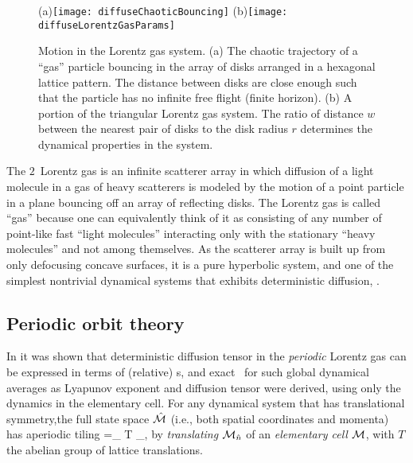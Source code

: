 \documentclass[aps,pre,
                showpacs,
                twocolumn,
                groupedaddress,
                floatfix]{revtex4-1}
\begin{document}
\begin{figure}[htbp]
  \begin{center}
    (a)\texttt{[image: diffuseChaoticBouncing]}
    (b)\texttt{[image: diffuseLorentzGasParams]}
  \end{center}
  \caption[]{\label{fig-chaoticBouncing} Motion in the Lorentz gas system. (a)  The chaotic trajectory of a ``gas'' particle bouncing in the array of disks  arranged in a hexagonal lattice pattern. The distance between disks are close  enough such that the particle has no infinite free flight (finite horizon).  (b) A portion of the triangular Lorentz gas    system. The ratio of distance $w$ between the nearest pair of disks to the    disk radius $r$ determines the dynamical properties in the system. }
\end{figure}

The $2$\dmn\ Lorentz gas is an infinite scatterer array in which diffusion of a light molecule in a gas of heavy scatterers is modeled by the motion of a point particle in a plane bouncing off an array of reflecting disks. The Lorentz gas is called ``gas'' because one can equivalently think of it as consisting of any number of point-like fast ``light molecules'' interacting only with the stationary ``heavy molecules'' and not among themselves.  As the scatterer array is built up from only defocusing concave surfaces, it is a pure hyperbolic system, and one of the simplest nontrivial dynamical systems that exhibits deterministic diffusion, .


\subsection{Periodic orbit theory}

In  it was shown that deterministic diffusion tensor in the {\em periodic} Lorentz gas can be expressed in terms of (relative) \po s, and exact \cycForm\ for such global dynamical averages as Lyapunov exponent and diffusion tensor were derived, using only the dynamics in the elementary cell. For any dynamical system that has translational symmetry,the full state space $\hat {{\cal M}}$ (i.e., both spatial coordinates and momenta) has aperiodic tiling 
\beq
\hM=\bigcup_{ \hn \in T} \pS_{\hn},
\eeq 
by {\em translating} ${\cal M}_{\hat n}$ of an {\em elementary cell} ${\cal M}$, with $T$ the abelian group of lattice translations.
\end{document}
